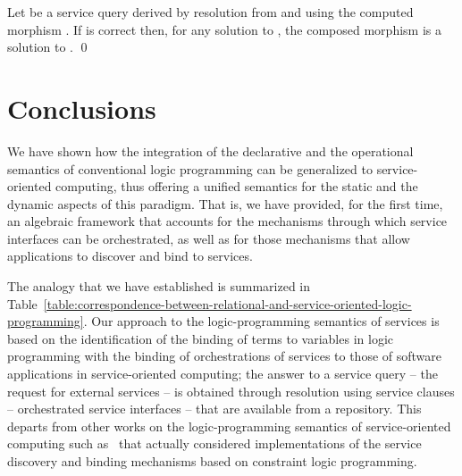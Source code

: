 \documentclass{LMCS}
\begin{document}
  \begin{prop}
    \label{proposition:soundness-of-service-oriented-resolution}
    Let  be a service query derived by resolution from  and  using the computed morphism .
    If  is correct then, for any solution  to , the composed morphism  is a solution to .
    \qed
  \end{prop}


  \section{Conclusions}

  We have shown how the integration of the declarative and the operational semantics of conventional logic programming can be generalized to service-oriented computing, thus offering a unified semantics for the static and the dynamic aspects of this paradigm.  That is, we have provided, for the first time, an algebraic framework that accounts for the mechanisms through which service interfaces can be orchestrated, as well as for those mechanisms that allow applications to discover and bind to services.

  The analogy that we have established is summarized in Table~\ref{table:correspondence-between-relational-and-service-oriented-logic-programming}.
  Our approach to the logic-programming semantics of services is based on the identification of the binding of terms to variables in logic programming with the binding of orchestrations of services to those of software applications in service-oriented computing; the answer to a service query -- the request for external services -- is obtained through resolution using service clauses -- orchestrated service interfaces -- that are available from a repository.
  This departs from other works on the logic-programming semantics of service-oriented computing such as~\cite{Kona-Bansal-Gupta:Automatic-composition-of-semantic-Web-services-2007} that actually considered implementations of the service discovery and binding mechanisms based on constraint logic programming.
\end{document}
